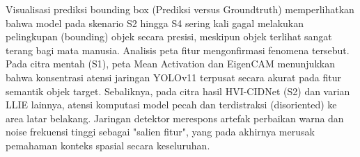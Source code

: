 ﻿\documentclass[conference]{IEEEtran}
\begin{document}
Visualisasi prediksi bounding box (Prediksi versus Groundtruth) memperlihatkan bahwa model pada skenario S2 hingga S4 sering kali gagal melakukan pelingkupan (bounding) objek secara presisi, meskipun objek terlihat sangat terang bagi mata manusia. Analisis peta fitur mengonfirmasi fenomena tersebut. Pada citra mentah (S1), peta Mean Activation dan EigenCAM menunjukkan bahwa konsentrasi atensi jaringan YOLOv11 terpusat secara akurat pada fitur semantik objek target. Sebaliknya, pada citra hasil HVI-CIDNet (S2) dan varian LLIE lainnya, atensi komputasi model pecah dan terdistraksi (disoriented) ke area latar belakang. Jaringan detektor merespons artefak perbaikan warna dan noise frekuensi tinggi sebagai "salien fitur", yang pada akhirnya merusak pemahaman konteks spasial secara keseluruhan.


\end{document}
